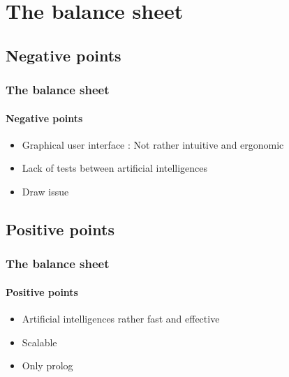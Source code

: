 \documentclass[a4paper, 11pt]{beamer}
\begin{document}
\section{The balance sheet}
\subsection{Negative points}
\begin{frame}
 \frametitle{The balance sheet}
 \framesubtitle{Negative points}
 \begin{itemize}
  \item Graphical user interface : Not rather intuitive and ergonomic
  \pause
  \item Lack of tests between artificial intelligences
  \pause
  \item Draw issue
 \end{itemize}
\end{frame}

\subsection{Positive points}
\begin{frame}
 \frametitle{The balance sheet}
 \framesubtitle{Positive points}
 \begin{itemize}
  \item Artificial intelligences rather fast and effective
  \pause
  \item Scalable
  \pause
  \item Only prolog
 \end{itemize}
\end{frame}
\end{document}
